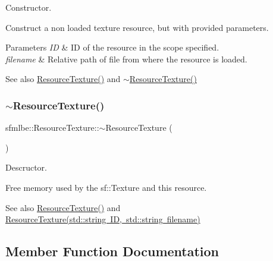 Constructor. 

Construct a non loaded texture resource, but with provided parameters. 
\begin{DoxyParams}{Parameters}
{\em ID} & ID of the resource in the scope specified. \\
\hline
{\em filename} & Relative path of file from where the resource is loaded. \\
\hline
\end{DoxyParams}
\begin{DoxySeeAlso}{See also}
\mbox{\hyperlink{classsfmlbe_1_1_resource_texture_aa1a489c8fe125057b3009f6615093118}{Resource\+Texture()}} and \mbox{\hyperlink{classsfmlbe_1_1_resource_texture_a98789b46742a42adffffe0abed982184}{$\sim$\+Resource\+Texture()}} 
\end{DoxySeeAlso}
\mbox{\label{classsfmlbe_1_1_resource_texture_a98789b46742a42adffffe0abed982184}} 
\subsubsection{\texorpdfstring{$\sim$\+Resource\+Texture()}{~ResourceTexture()}}
{\footnotesize\ttfamily sfmlbe\+::\+Resource\+Texture\+::$\sim$\+Resource\+Texture (\begin{DoxyParamCaption}{ }\end{DoxyParamCaption})}



Descructor. 

Free memory used by the sf\+::\+Texture and this resource. \begin{DoxySeeAlso}{See also}
\mbox{\hyperlink{classsfmlbe_1_1_resource_texture_aa1a489c8fe125057b3009f6615093118}{Resource\+Texture()}} and \mbox{\hyperlink{classsfmlbe_1_1_resource_texture_a458e1b22fd5074534d86f2665637ae34}{Resource\+Texture(std\+::string I\+D, std\+::string filename)}} 
\end{DoxySeeAlso}


\subsection{Member Function Documentation}
\mbox{\label{classsfmlbe_1_1_resource_texture_a354d8f497b1ea0ca39c467219edc76c7}} 
